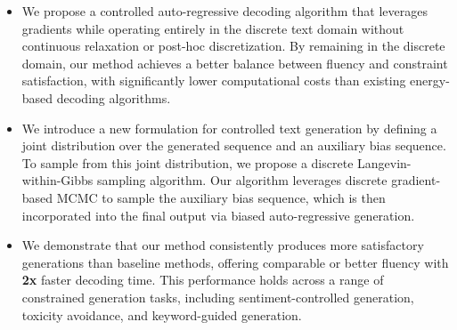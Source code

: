 \begin{itemize}
\item We propose a controlled auto-regressive decoding algorithm that leverages gradients while operating entirely in the discrete text domain without continuous relaxation or post-hoc discretization. By remaining in the discrete domain, our method achieves a better balance between fluency and constraint satisfaction, with significantly lower computational costs than existing energy-based decoding algorithms.

\item We introduce a new formulation for controlled text generation by defining a joint distribution over the generated sequence and an auxiliary bias sequence. To sample from this joint distribution, we propose a discrete Langevin-within-Gibbs sampling algorithm. Our algorithm leverages discrete gradient-based MCMC to sample the auxiliary bias sequence, which is then incorporated into the final output via biased auto-regressive generation.

\item We demonstrate that our method consistently produces more satisfactory generations than baseline methods, offering comparable or better fluency with \textbf{2x} faster decoding time. 
This performance holds across a range of constrained generation tasks, including sentiment-controlled generation, toxicity avoidance, and keyword-guided generation. 
\end{itemize}
